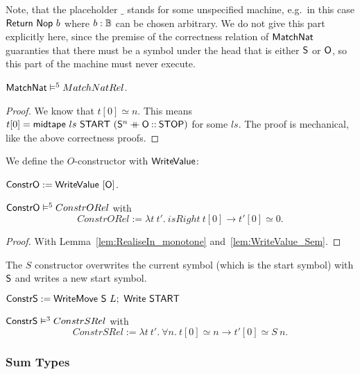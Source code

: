 Note, that the placeholder $\_$ stands for some unspecified machine, e.g.\ in this case $\mathsf{Return}~\mathsf{Nop}~b$ where $b:\mathbb{B}$ can be chosen arbitrary.
We do not give this part explicitly here, since the premise of the correctness relation of $\mathsf{MatchNat}$ guaranties that there must be a symbol
under the head that is either $\mathsf{S}$ or $\mathsf{O}$, so this part of the machine must never execute.

\begin{lemma}
  $\mathsf{MatchNat} \mathrel{\vDash^{5}} MatchNatRel$.
\end{lemma}
\begin{proof}
  We know that $t[0] \simeq n$.  This means $t[0] = \mathsf{midtape}~ls~\mathsf{START}~(\mathsf{S}^n \mathbin{+\mkern-10mu+} \mathsf{O} \mathbin{::} \mathsf{STOP})$ for some $ls$.  The proof is
  mechanical, like the above correctness proofs.
\end{proof}

We define the $O$-constructor with $\mathsf{WriteValue}$:
\begin{definition}[$\MS{ConstrO}$][Constr_O]
  \label{def:Constr_O}
  $\mathsf{ConstrO} := \mathsf{WriteValue}~[\mathsf{O}]$.
\end{definition}
\begin{lemma}
  \label{lem:Constr_O_Sem}
  $\mathsf{ConstrO} \mathrel{\vDash^{5}} ConstrORel$ with
  \[
    ConstrORel := \lambda t~t'.~isRight~t[0] \rightarrow t'[0] \simeq 0.
  \]
\end{lemma}
\begin{proof}
  With Lemma~\ref{lem:RealiseIn_monotone} and~\ref{lem:WriteValue_Sem}.
\end{proof}

The $S$ constructor overwrites the current symbol (which is the start symbol) with $\mathsf{S}$ and writes a new start symbol.
\begin{definition}[$\MS{ConstrS}$][Constr_S]
  $\mathsf{ConstrS} := \mathsf{WriteMove}~\mathsf{S}~L ;~ \mathsf{Write}~\mathsf{START}$
\end{definition}
\begin{lemma}
  $\mathsf{ConstrS} \mathrel{\vDash^{3}} ConstrSRel$ with
  \[
    ConstrSRel := \lambda t~t'.~\forall n.~ t[0] \simeq n \rightarrow t'[0] \simeq S~n.
  \]
\end{lemma}


\subsubsection{Sum Types}
\label{sec:match-sum}

